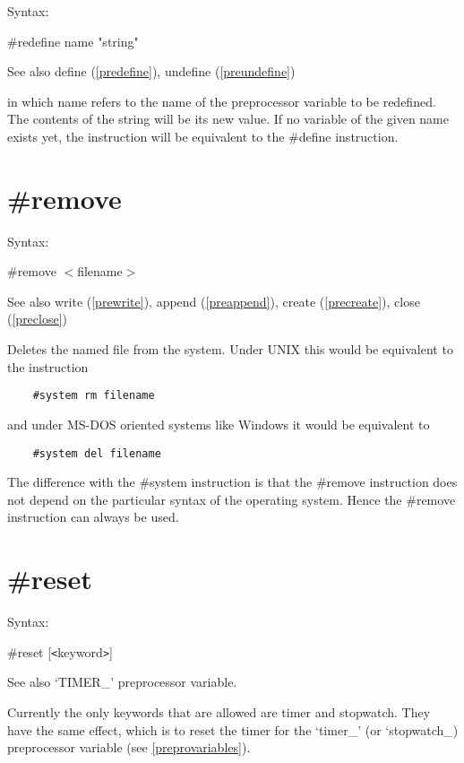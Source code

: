 \noindent Syntax:

\#redefine name "string"
 
\noindent See also define (\ref{predefine}), undefine 
(\ref{preundefine})

\noindent in which name refers to the name of the 
preprocessor 
variable to be redefined. The contents of the 
string will be its new value. If no variable of the given name exists yet, 
the instruction will be equivalent to the \#define 
instruction.

 
\section{\#remove}
\label{preremove}

\noindent Syntax:

\#remove $<$filename$>$
 
\noindent See also write (\ref{prewrite}), append (\ref{preappend}),
            create (\ref{precreate}), close (\ref{preclose})

\noindent Deletes the named file from the system. Under 
UNIX this would be equivalent to the instruction
\begin{verbatim}
    #system rm filename
\end{verbatim}
and under MS-DOS oriented systems like Windows 
it would be equivalent to
\begin{verbatim}
    #system del filename
\end{verbatim}
The difference with the \#system instruction is that the 
\#remove instruction does not depend on the particular 
syntax of the operating system. Hence the \#remove instruction can always 
be used.

 
\section{\#reset}
\label{prereset}

\noindent Syntax:

\#reset [{\tt<}keyword{\tt>}]

\noindent See also `TIMER\_' preprocessor variable.

\noindent Currently the only keywords that are allowed are timer and 
stopwatch. They have the same effect, which is to reset the timer for the 
`timer\_' (or `stopwatch\_) preprocessor variable (see \ref{preprovariables}).

